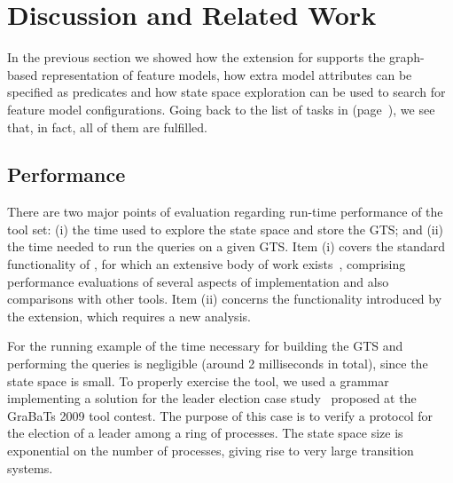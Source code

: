 \section{Discussion and Related Work}

In the previous section we showed how the \Prolog extension for \GROOVE
supports the graph-based representation of feature models, how extra model
attributes can be specified as \Prolog predicates and how state space
exploration can be used to search for feature model configurations. Going back
to the list of tasks in  (page~\pageref{options}), we see that,
in fact, all of them are fulfilled.

\subsection{Performance}

There are two major points of evaluation regarding run-time performance of the
tool set: (i) the time used to explore the state space and store the GTS; and 
(ii) the time needed to run the \Prolog queries on a given GTS. Item (i)
covers the standard functionality of \GROOVE, for which an extensive
body of work exists~\cite{RenVar2004,Rensink2006,CPR2008,GJR2010},
comprising performance evaluations of several aspects of \GROOVE implementation
and also comparisons with other tools. Item (ii) concerns the functionality
introduced by the \Prolog extension, which requires a new analysis.

For the running example of  the time necessary for building
the GTS and performing the \Prolog queries is negligible (around 2 milliseconds
in total), since the state space is small. To properly exercise the tool, we
used a grammar implementing a solution for the leader election case
study~\cite{LE-GRABATS} proposed at the GraBaTs 2009 tool contest. The purpose
of this case is to verify a protocol for the election of a leader among a ring
of processes. The state space size is exponential on the number of processes,
giving rise to very large transition systems.

